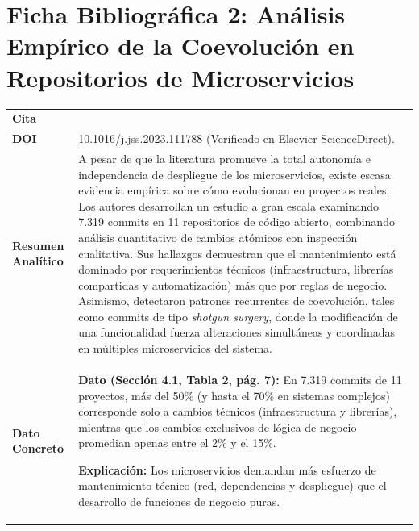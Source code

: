 \documentclass[11pt,a4paper]{article}
\begin{document}
\newpage

\section{Ficha Bibliográfica 2: Análisis Empírico de la Coevolución en Repositorios de Microservicios}

\noindent
\renewcommand{\arraystretch}{1.2}
\begin{tabularx}{\textwidth}{|>{\raggedright\arraybackslash}p{3.2cm}|X|}
\hline
\multicolumn{2}{|c|}{\bfseries FICHA DE LECTURA N.° 2: COEVOLUCIÓN EN MICROSERVICIOS} \\
\hline
\textbf{Cita} & \parbox{\dimexpr\linewidth-6pt\relax}{\raggedright\vspace{2pt}\vspace{2pt}} \\
\hline
\textbf{DOI} & \href{https://doi.org/10.1016/j.jss.2023.111788}{10.1016/j.jss.2023.111788} (Verificado en Elsevier ScienceDirect). \\
\hline
\textbf{Resumen Analítico} & A pesar de que la literatura promueve la total autonomía e independencia de despliegue de los microservicios, existe escasa evidencia empírica sobre cómo evolucionan en proyectos reales. Los autores desarrollan un estudio a gran escala examinando 7.319 commits en 11 repositorios de código abierto, combinando análisis cuantitativo de cambios atómicos con inspección cualitativa. Sus hallazgos demuestran que el mantenimiento está dominado por requerimientos técnicos (infraestructura, librerías compartidas y automatización) más que por reglas de negocio. Asimismo, detectaron patrones recurrentes de coevolución, tales como commits de tipo \emph{shotgun surgery}, donde la modificación de una funcionalidad fuerza alteraciones simultáneas y coordinadas en múltiples microservicios del sistema. \\
\hline
\textbf{Dato Concreto} & \textbf{Dato (Sección 4.1, Tabla 2, pág. 7):} En 7.319 commits de 11 proyectos, más del 50\% (y hasta el 70\% en sistemas complejos) corresponde solo a cambios técnicos (infraestructura y librerías), mientras que los cambios exclusivos de lógica de negocio promedian apenas entre el 2\% y el 15\%. \par\vspace{0.2em}
\textbf{Explicación:} Los microservicios demandan más esfuerzo de mantenimiento técnico (red, dependencias y despliegue) que el desarrollo de funciones de negocio puras. \\

\end{tabularx}
\end{document}
